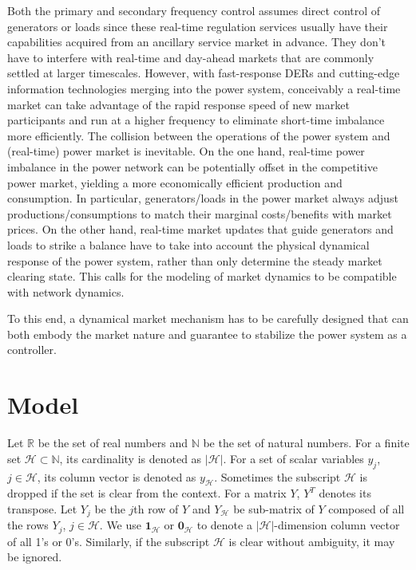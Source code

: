 \documentclass[journal,12pt,onecolumn,draftclsnofoot]{IEEEtran}
\begin{document}
Both the primary and secondary frequency control assumes direct control of generators or loads since these real-time regulation services usually have their capabilities acquired from an ancillary service market in advance. They don't have to interfere with real-time and day-ahead markets that are commonly settled at larger timescales. However, with fast-response DERs and cutting-edge information technologies merging into the power system, conceivably a real-time market can take advantage of the rapid response speed of new market participants and run at a higher frequency to eliminate short-time imbalance more efficiently. The collision between the operations of the power system and (real-time) power market is inevitable. On the one hand, real-time power imbalance in the power network can be potentially offset in the competitive power market, yielding a more economically efficient production and consumption. In particular, generators/loads in the power market always adjust productions/consumptions to match their marginal costs/benefits with market prices. On the other hand, real-time market updates that guide generators and loads to strike a balance have to take into account the physical dynamical response of the power system, rather than only determine the steady market clearing state. This calls for the modeling of market dynamics to be compatible with network dynamics.

To this end, a dynamical market mechanism has to be carefully designed that can both embody the market nature and guarantee to stabilize the power system as a controller.

     



   

\section{Model}

Let $\mathbb{R}$ be the set of real numbers and $\mathbb{N}$ be the set of natural numbers. For a finite set $\mathcal{H} \subset \mathbb{N}$, its cardinality is denoted as $|\mathcal{H}|$. For a set of scalar variables $y_j$, $j\in\mathcal{H}$, its column vector is denoted as $y_{\mathcal{H}}$. Sometimes the subscript $\mathcal{H}$ is dropped if the set is clear from the context. For a matrix $Y$, $Y^T$ denotes its transpose. Let $Y_j$ be the $j$th row of $Y$ and $Y_\mathcal{H}$ be sub-matrix of $Y$ composed of all the rows $Y_j$, $j\in\mathcal{H}$. We use $\mathbf{1}_\mathcal{H}$ or $\mathbf{0}_{\mathcal{H}}$ to denote a $|\mathcal{H}|$-dimension column vector of all 1's or 0's. Similarly, if the subscript $\mathcal{H}$ is clear without ambiguity, it may be ignored. 
\end{document}
